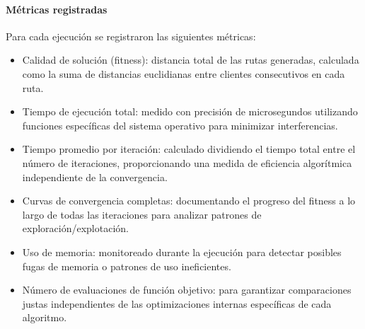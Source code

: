 \documentclass[conference,a4paper]{IEEEtran}
\begin{document}
\paragraph{Métricas registradas} Para cada ejecución se registraron las siguientes métricas:
\begin{itemize}
\item Calidad de solución (fitness): distancia total de las rutas generadas, calculada como la suma de distancias euclidianas entre clientes consecutivos en cada ruta.
\item Tiempo de ejecución total: medido con precisión de microsegundos utilizando funciones específicas del sistema operativo para minimizar interferencias.
\item Tiempo promedio por iteración: calculado dividiendo el tiempo total entre el número de iteraciones, proporcionando una medida de eficiencia algorítmica independiente de la convergencia.
\item Curvas de convergencia completas: documentando el progreso del fitness a lo largo de todas las iteraciones para analizar patrones de exploración/explotación.
\item Uso de memoria: monitoreado durante la ejecución para detectar posibles fugas de memoria o patrones de uso ineficientes.
\item Número de evaluaciones de función objetivo: para garantizar comparaciones justas independientes de las optimizaciones internas específicas de cada algoritmo.
\end{itemize}
\end{document}

